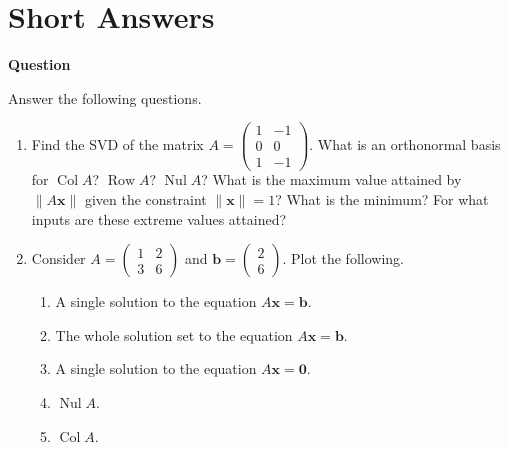 \documentclass[10pt, titlepage]{article}
\newcounter{question}
\newenvironment{newquestion}
{
	\noindent\textbf{Question \thequestion}
}
{
\stepcounter{question}
\par
}
\renewcommand{\vec}[1]{\bm{#1}}
\DeclareMathOperator{\colspace}{Col}
\DeclareMathOperator{\rowspace}{Row}
\DeclareMathOperator{\nullspace}{Nul}
\begin{document}
\section{\centering Short Answers}
\begin{newquestion}
	Answer the following questions.
	\begin{enumerate}
		\item Find the SVD of the matrix \(A = \begin{pmatrix}1 & -1 \\ 0 & 0 \\ 1 & -1\end{pmatrix}\). What is an orthonormal basis for \(\colspace A\)? 
			\(\rowspace A\)? \(\nullspace A\)? What is the maximum value attained by \(\|A\vec{x}\|\) given the constraint \(\|\vec{x}\| = 1\)? What is 
			the minimum? For what inputs are these extreme values attained?
		\item Consider \(A = \begin{pmatrix}1 & 2 \\ 3 & 6\end{pmatrix}\) and \(\vec{b} = \begin{pmatrix}2 \\ 6\end{pmatrix}\). Plot the following.
			\begin{enumerate}
				\item A single solution to the equation \(A \vec{x} = \vec{b}\).
				\item The whole solution set to the equation \(A \vec{x} = \vec{b}\).
				\item A single solution to the equation \(A \vec{x} = \vec{0}\).
				\item \(\nullspace A\).
				\item \(\colspace A\).
			\end{enumerate}
	\end{enumerate}
\end{newquestion}

\newpage

\end{document}
